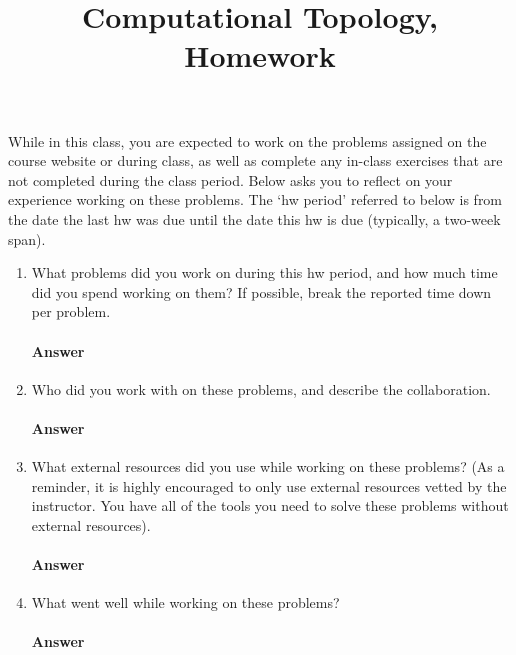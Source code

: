 \documentclass{article}
\title{Computational Topology, Homework \todo{}}
\author{\todo{Put Your Name Here}}
\begin{document}
\maketitle

While in this class, you are expected to work on the problems assigned on the
course website or during class,
as well as complete any in-class exercises that are not completed
during the class period.
Below asks you to reflect on your experience working on these problems. The
`hw period' referred to below is from the date the last hw was due until the date
this hw is due (typically, a two-week span).

\begin{enumerate}
    \item What problems did you work on during this hw period, and how much time
        did you spend working on them?  If possible, break the reported time down per
        problem.

        \paragraph{Answer}

    \item Who did you work with on these problems, and describe the collaboration.

        \paragraph{Answer}

    \item What external resources did you use while working on these problems?
        (As a reminder, it is highly encouraged to only use external resources
        vetted by the instructor. You have all of the tools you need to solve
        these problems without external resources).

        \paragraph{Answer}

    \item What went well while working on these problems?

        \paragraph{Answer}


\end{enumerate}
\end{document}
